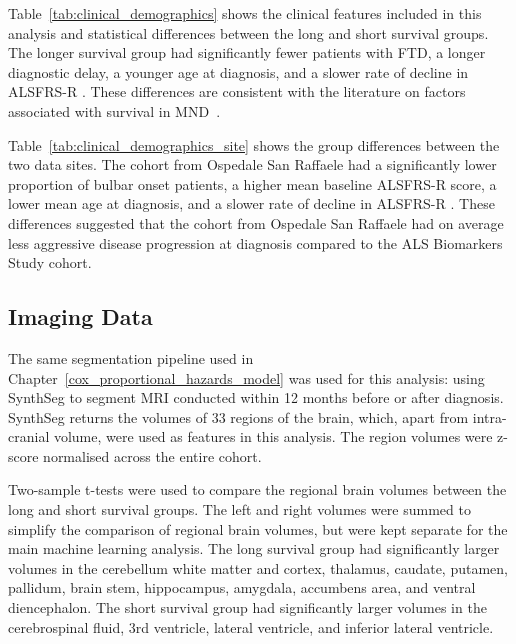 Table~\ref{tab:clinical_demographics} shows the clinical features included in this analysis and statistical differences between the long and short survival groups.
The longer survival group had significantly fewer patients with FTD, a longer diagnostic delay, a younger age at diagnosis, and a slower rate of decline in ALSFRS-R .
These differences are consistent with the literature on factors associated with survival in MND~\cite{suPredictorsSurvivalPatients2021}.


Table~\ref{tab:clinical_demographics_site} shows the group differences between the two data sites.
The cohort from Ospedale San Raffaele had a significantly lower proportion of bulbar onset patients, a higher mean baseline ALSFRS-R score, a lower mean age at diagnosis, and a slower rate of decline in ALSFRS-R .
These differences suggested that the cohort from Ospedale San Raffaele had on average less aggressive disease progression at diagnosis compared to the ALS Biomarkers Study cohort.


\subsection{Imaging Data}
The same segmentation pipeline used in Chapter~\ref{cox_proportional_hazards_model} was used for this analysis: using SynthSeg to segment MRI conducted within 12 months before or after diagnosis.
SynthSeg returns the volumes of 33 regions of the brain, which, apart from intra-cranial volume, were used as features in this analysis.
The region volumes were z-score normalised across the entire cohort.

Two-sample t-tests were used to compare the regional brain volumes between the long and short survival groups.
The left and right volumes were summed to simplify the comparison of regional brain volumes, but were kept separate for the main machine learning analysis.
The long survival group had significantly larger volumes in the cerebellum white matter and cortex, thalamus, caudate, putamen, pallidum, brain stem, hippocampus, amygdala, accumbens area, and ventral diencephalon.
The short survival group had significantly larger volumes in the cerebrospinal fluid, 3rd ventricle, lateral ventricle, and inferior lateral ventricle.


